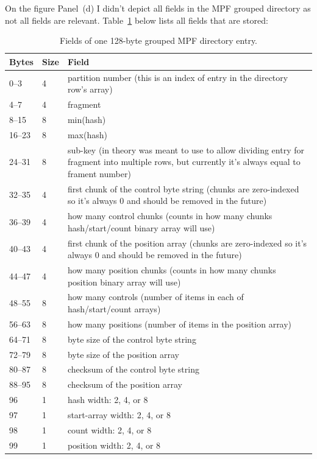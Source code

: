 On the figure Panel~(d) I didn't depict all fields in the MPF grouped directory as not all fields are relevant.
Table~\ref{tab:grouped-mpf-directory-entry} below lists all fields that are stored:
\begin{table}[htbp]
\centering
\small
\caption{Fields of one 128-byte grouped MPF directory entry.}
\label{tab:grouped-mpf-directory-entry}
\begin{tabularx}{\linewidth}{@{}llX@{}}
\toprule
\textbf{Bytes} & \textbf{Size} & \textbf{Field}\\
\midrule
0--3 & 4 & partition number (this is an index of entry in the directory row's array)\\
4--7 & 4 & fragment\\
8--15 & 8 & min(hash)\\
16--23 & 8 & max(hash)\\
24--31 & 8 & sub-key (in theory was meant to use to allow dividing entry for fragment into multiple rows, but currently it's always equal to frament number)\\
32--35 & 4 & first chunk of the control byte string (chunks are zero-indexed so it's always $0$ and should be removed in the future)\\
36--39 & 4 & how many control chunks (counts in how many chunks hash/start/count binary array will use)\\
40--43 & 4 & first chunk of the position array (chunks are zero-indexed so it's always $0$ and should be removed in the future)\\
44--47 & 4 & how many position chunks (counts in how many chunks position binary array will use)\\
48--55 & 8 & how many controls (number of items in each of hash/start/count arrays)\\
56--63 & 8 & how many positions (number of items in the position array)\\
64--71 & 8 & byte size of the control byte string\\
72--79 & 8 & byte size of the position array\\
80--87 & 8 & checksum of the control byte string\\
88--95 & 8 & checksum of the position array\\
96 & 1 & hash width: 2, 4, or 8\\
97 & 1 & start-array width: 2, 4, or 8\\
98 & 1 & count width: 2, 4, or 8\\
99 & 1 & position width: 2, 4, or 8\\

\end{tabularx}
\end{table}
